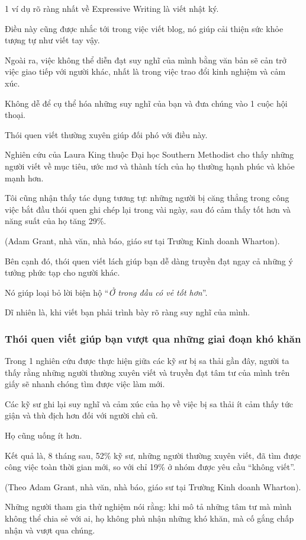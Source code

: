 \documentclass{article}
\begin{document}
1 ví dụ rõ ràng nhất về Expressive Writing là viết nhật ký.

Điều này cũng được nhắc tới trong việc viết blog, nó giúp cải thiện sức khỏe tượng tự như viết tay vậy.

%
Ngoài ra, việc không thể diễn đạt suy nghĩ của mình bằng văn bản sẽ cản trở việc giao tiếp với người khác, nhất là trong việc trao đổi kinh nghiệm và cảm xúc.

Không dễ để cụ thể hóa những suy nghĩ của bạn và đưa chúng vào  1 cuộc hội thoại.

Thói quen viết thường xuyên giúp đối phó với điều này.

%
Nghiên cứu của Laura King thuộc Đại học Southern Methodist cho thấy những người viết về mục tiêu, ước mơ và thành tích của họ thường hạnh phúc và khỏe mạnh hơn.

Tôi cũng nhận thấy tác dụng tương tự: những người bị căng thẳng trong công việc bắt đầu thói quen ghi chép lại trong vài ngày, sau đó cảm thấy tốt hơn và năng suất của họ tăng 29\%.

(Adam Grant, nhà văn, nhà báo, giáo sư tại Trường Kinh doanh Wharton).

%
Bên cạnh đó, thói quen viết lách giúp bạn dễ dàng truyền đạt ngay cả những ý tưởng phức tạp cho người khác.

Nó giúp loại bỏ lời biện hộ ``\textit{Ở trong đầu có vẻ tốt hơn}''.

Dĩ nhiên là, khi viết bạn phải trình bày rõ ràng suy nghĩ của mình.

\subsubsection{Thói quen viết giúp bạn vượt qua những giai đoạn khó khăn}
Trong 1 nghiên cứu được thực hiện giữa các kỹ sư bị sa thải gần đây, người ta thấy rằng những người thường xuyên viết và truyền đạt tâm tư của mình trên giấy sẽ nhanh chóng tìm được việc làm mới.

%
Các kỹ sư ghi lại suy nghĩ và cảm xúc của họ về việc bị sa thải ít cảm thấy tức giận và thù địch hơn đối với người chủ cũ.

Họ cũng uống ít hơn.

Kết quả là, 8 tháng sau, 52\% kỹ sư, những người thường xuyên viết, đã tìm được công việc toàn thời gian mới, so với chỉ 19\% ở nhóm được yêu cầu ``không viết''.

(Theo Adam Grant, nhà văn, nhà báo, giáo sư tại Trường Kinh doanh Wharton).

%
Những người tham gia thử nghiệm nói rằng: khi mô tả những tâm tư mà mình  không thể chia sẻ với ai, họ không phủ nhận những khó khăn, mà cố gắng chấp nhận và vượt qua chúng.
\end{document}

